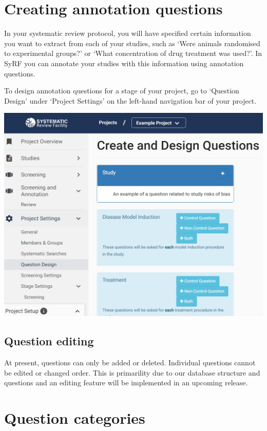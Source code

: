 \documentclass[
]{book}
\begin{document}
\hypertarget{creating-annotation-questions}{%
\section{Creating annotation questions}\label{creating-annotation-questions}}

In your systematic review protocol, you will have specified certain information you want to extract from each of your studies, such as `Were animals randomised to experimental groups?' or `What concentration of drug treatment was used?'. In SyRF you can annotate your studies with this information using annotation questions.

To design annotation questions for a stage of your project, go to `Question Design' under `Project Settings' on the left-hand navigation bar of your project.

\includegraphics[width=1\textwidth,height=1\textheight]{figs/Fig_Question_design.png}

\hypertarget{question-editing}{%
\subsection{Question editing}\label{question-editing}}

At present, questions can only be added or deleted. Individual questions cannot be edited or changed order. This is primarility due to our database structure and questions and an editing feature will be implemented in an upcoming release.

\hypertarget{question-categories}{%
\section{Question categories}\label{question-categories}}
\end{document}

